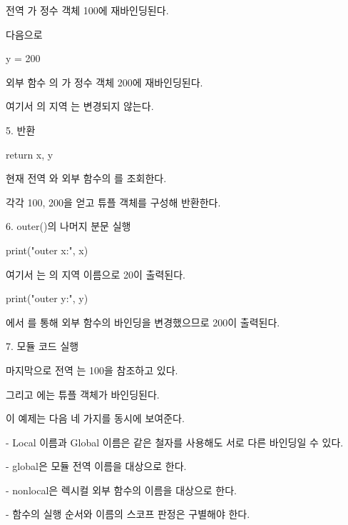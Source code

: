 전역 가 정수 객체 100에 재바인딩된다.

다음으로

\begin{dhkcode}
y = 200
\end{dhkcode}

외부 함수 의 가 정수 객체 200에 재바인딩된다.

여기서 의 지역 는 변경되지 않는다.

\begin{dhknote}
\begin{dhksmry}[centered]
5. 반환
\end{dhksmry}
\end{dhknote}

\begin{dhkcode}
return x, y
\end{dhkcode}

현재 전역 와 외부 함수의 를 조회한다.

각각 100, 200을 얻고 튜플 객체를 구성해 반환한다.

\begin{dhknote}
\begin{dhksmry}[centered]
6. outer()의 나머지 분문 실행
\end{dhksmry}
\end{dhknote}

\begin{dhkcode}
print("outer x:", x)
\end{dhkcode}

여기서 는 의 지역 이름으로 20이 출력된다.

\begin{dhkcode}
print("outer y:", y)
\end{dhkcode}

에서 를 통해 외부 함수의 바인딩을 변경했으므로 200이 출력된다.

\begin{dhknote}
\begin{dhksmry}[centered]
7. 모듈 코드 실행
\end{dhksmry}
\end{dhknote}

마지막으로 전역 는 100을 참조하고 있다.

그리고 에는  튜플 객체가 바인딩된다.

이 예제는 다음 네 가지를 동시에 보여준다.

\begin{dhksmry}
    - Local 이름과 Global 이름은 같은 철자를 사용해도
      서로 다른 바인딩일 수 있다.

    - global은 모듈 전역 이름을 대상으로 한다.

    - nonlocal은 렉시컬 외부 함수의 이름을 대상으로 한다.

    - 함수의 실행 순서와 이름의 스코프 판정은 구별해야 한다.
\end{dhksmry}

